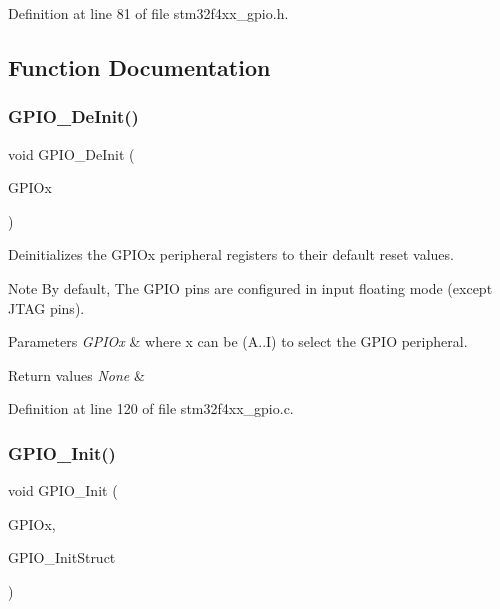 Definition at line 81 of file stm32f4xx\+\_\+gpio.\+h.



\subsection{Function Documentation}
\mbox{\label{group___g_p_i_o_gaa60bdf3182c44b5fa818f237042f52ee}} 
\subsubsection{\texorpdfstring{G\+P\+I\+O\+\_\+\+De\+Init()}{GPIO\_DeInit()}}
{\footnotesize\ttfamily void G\+P\+I\+O\+\_\+\+De\+Init (\begin{DoxyParamCaption}\item[{\hyperlink{struct_g_p_i_o___type_def}{G\+P\+I\+O\+\_\+\+Type\+Def} $\ast$}]{G\+P\+I\+Ox }\end{DoxyParamCaption})}



Deinitializes the G\+P\+I\+Ox peripheral registers to their default reset values. 

\begin{DoxyNote}{Note}
By default, The G\+P\+IO pins are configured in input floating mode (except J\+T\+AG pins). 
\end{DoxyNote}

\begin{DoxyParams}{Parameters}
{\em G\+P\+I\+Ox} & where x can be (A..I) to select the G\+P\+IO peripheral. \\
\hline
\end{DoxyParams}

\begin{DoxyRetVals}{Return values}
{\em None} & \\
\hline
\end{DoxyRetVals}


Definition at line 120 of file stm32f4xx\+\_\+gpio.\+c.

\mbox{\label{group___g_p_i_o_ga71abf9404261370d03cca449b88d3a65}} 
\subsubsection{\texorpdfstring{G\+P\+I\+O\+\_\+\+Init()}{GPIO\_Init()}}
{\footnotesize\ttfamily void G\+P\+I\+O\+\_\+\+Init (\begin{DoxyParamCaption}\item[{\hyperlink{struct_g_p_i_o___type_def}{G\+P\+I\+O\+\_\+\+Type\+Def} $\ast$}]{G\+P\+I\+Ox,  }\item[{\hyperlink{struct_g_p_i_o___init_type_def}{G\+P\+I\+O\+\_\+\+Init\+Type\+Def} $\ast$}]{G\+P\+I\+O\+\_\+\+Init\+Struct }\end{DoxyParamCaption})}



